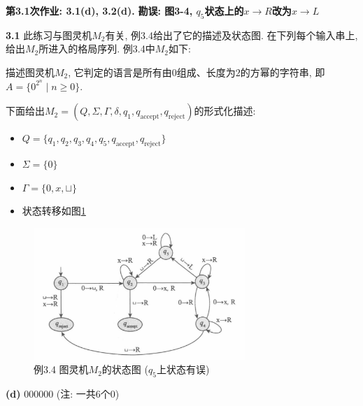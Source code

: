 \documentclass[UTF8]{report}
\newcommand{\ra}{\rightarrow}
\newcommand{\problem}[1]{{\setlength{\parskip}{10pt}\noindent \bf{#1}}}
\begin{document}

\maketitle



\textbf{第3.1次作业: 3.1(d), 3.2(d).}
\textbf{勘误: 图3-4, $q_5$状态上的$x\ra R$改为$x\ra L$}


\problem{3.1} 此练习与图灵机$M_2$有关, 例3.4给出了它的描述及状态图. 在下列每个输入串上, 给出$M_2$所进入的格局序列. 例3.4中$M_2$如下:

描述图灵机$M_2$, 它判定的语言是所有由$0$组成、长度为$2$的方幂的字符串, 即$A = \{ 0^{2^n} \mid n\geq 0\}$.

下面给出$M_2 = (Q, \Sigma, \Gamma, \delta, q_1, q_{\text{accept}}, q_{\text{reject}})$的形式化描述:
\begin{itemize}
    \item $Q = \{q_1, q_2, q_3, q_4, q_5, q_{\text{accept}}, q_{\text{reject}}\}$
    \item $\Sigma = \{0\}$
    \item $\Gamma = \{0, x, \sqcup\}$
    \item 状态转移如图\ref{fig:3_1}
\end{itemize}
\begin{figure}[!htbp]
    \centering
    \includegraphics[width=8cm]{image/3.1.png}
    \caption{例3.4 图灵机$M_2$的状态图 ($q_5$上状态有误)}
    \label{fig:3_1}
\end{figure}

\problem{(d)} $000000$ (注: 一共$6$个$0$)
\end{document}
